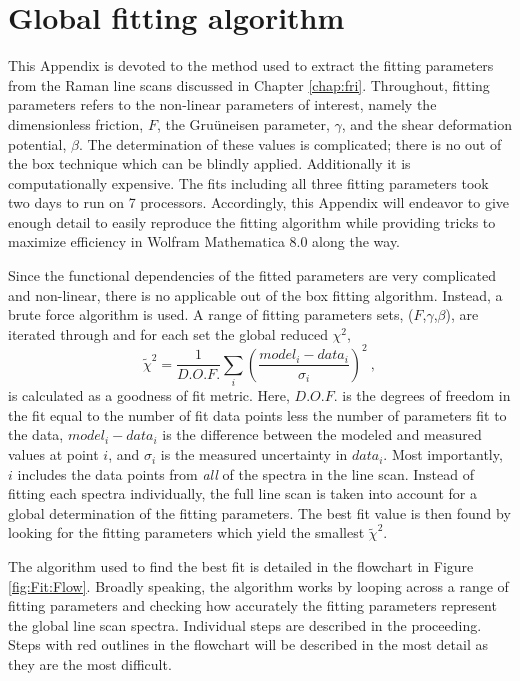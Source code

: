 \chapter{Global fitting algorithm \label{chap:Fit}}
This Appendix is devoted to the method used to extract the fitting parameters from the Raman line scans discussed in Chapter \ref{chap:fri}.
Throughout, fitting parameters refers to the non-linear parameters of interest, namely the dimensionless friction, $F$, the Gru\"uneisen parameter, $\gamma$, and the shear deformation potential, $\beta$.
The determination of these values is complicated; there is no out of the box technique which can be blindly applied.
Additionally it is computationally expensive.
The fits including all three fitting parameters took two days to run on 7 processors.
Accordingly, this Appendix will endeavor to give enough detail to easily reproduce the fitting algorithm while providing tricks to maximize efficiency in Wolfram Mathematica 8.0 along the way.

Since the functional dependencies of the fitted parameters are very complicated and non-linear, there is no applicable out of the box fitting algorithm.
Instead, a brute force algorithm is used.
A range of fitting parameters sets, ($F$,$\gamma$,$\beta$), are iterated through and for each set the global reduced $\chi^2$, 
\begin{equation*}
	\tilde{\chi}^2=\frac{1}{D.O.F.} \sum_i \left( \frac{model_i-data_i}{\sigma_i} \right)^2 \ ,
\end{equation*}
is calculated as a goodness of fit metric.
Here, $D.O.F.$ is the degrees of freedom in the fit equal to the number of fit data points less the number of parameters fit to the data, $model_i-data_i$ is the difference between the modeled and measured values at point $i$, and $\sigma_i$ is the measured uncertainty in $data_i$.
Most importantly, $i$ includes the data points from \emph{all} of the spectra in the line scan.
Instead of fitting each spectra individually, the full line scan is taken into account for a global determination of the fitting parameters.
The best fit value is then found by looking for the fitting parameters which yield the smallest $\tilde{\chi}^2$.

The algorithm used to find the best fit is detailed in the flowchart in Figure \ref{fig:Fit:Flow}.
Broadly speaking, the algorithm works by looping across a range of fitting parameters and checking how accurately the fitting parameters represent the global line scan spectra.
Individual steps are described in the proceeding.
Steps with red outlines in the flowchart will be described in the most detail as they are the most difficult.

